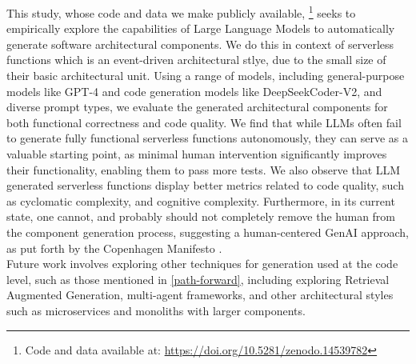 This study, whose code and data we make publicly available, \footnote{Code and data available at: \url{https://doi.org/10.5281/zenodo.14539782}} seeks to empirically explore the capabilities of Large Language Models to automatically generate software architectural components. We do this in context of serverless functions which is an event-driven architectural stlye, due to the small size of their basic architectural unit. Using a range of models, including general-purpose models like GPT-4 and code generation models like DeepSeekCoder-V2, and diverse prompt types, we evaluate the generated architectural components for both functional correctness and code quality. We find that while LLMs often fail to generate fully functional serverless functions autonomously, they can serve as a valuable starting point, as minimal human intervention significantly improves their functionality, enabling them to pass more tests. We also observe that LLM  generated serverless functions display better metrics related to code quality, such as cyclomatic complexity, and cognitive complexity. Furthermore, in its current state, one cannot, and probably should not completely remove the human from the component generation process, suggesting a human-centered GenAI approach, as put forth by the Copenhagen Manifesto \cite{copenhagen_manifesto}.\\
Future work involves exploring other techniques for generation used at the code level, such as those mentioned in \ref{path-forward}, including exploring Retrieval Augmented Generation, multi-agent frameworks, and other architectural styles such as microservices and monoliths with larger components.